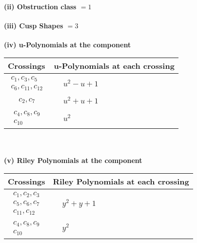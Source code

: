 \documentclass[1p]{elsarticle_modified}
\theoremstyle{definition}
\begin{document}
\flushleft \textbf{(ii) Obstruction class $= 1$}\\~\\
\flushleft \textbf{(iii) Cusp Shapes $= 3$}\\~\\
\newpage\renewcommand{\arraystretch}{1}
\flushleft \textbf{(iv) u-Polynomials at the component}\newline \\
\begin{tabular}{m{50pt}|m{274pt}}
Crossings & \hspace{64pt}u-Polynomials at each crossing \\
\hline $$\begin{aligned}c_{1},c_{3},c_{5}\\c_{6},c_{11},c_{12}\end{aligned}$$&$\begin{aligned}
&u^2- u+1
\end{aligned}$\\
\hline $$\begin{aligned}c_{2},c_{7}\end{aligned}$$&$\begin{aligned}
&u^2+u+1
\end{aligned}$\\
\hline $$\begin{aligned}c_{4},c_{8},c_{9}\\c_{10}\end{aligned}$$&$\begin{aligned}
&u^2
\end{aligned}$\\
\hline
\end{tabular}\\~\\
\newpage\renewcommand{\arraystretch}{1}
\flushleft \textbf{(v) Riley Polynomials at the component}\newline \\
\begin{tabular}{m{50pt}|m{274pt}}
Crossings & \hspace{64pt}Riley Polynomials at each crossing \\
\hline $$\begin{aligned}c_{1},c_{2},c_{3}\\c_{5},c_{6},c_{7}\\c_{11},c_{12}\end{aligned}$$&$\begin{aligned}
&y^2+y+1
\end{aligned}$\\
\hline $$\begin{aligned}c_{4},c_{8},c_{9}\\c_{10}\end{aligned}$$&$\begin{aligned}
&y^2
\end{aligned}$\\
\hline
\end{tabular}\\~\\
\end{document}
